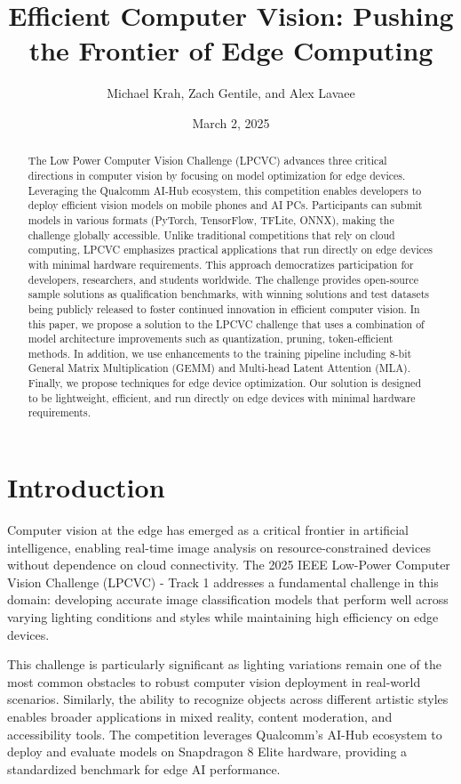 \documentclass[11pt, oneside]{article}   	%
\title{Efficient Computer Vision: Pushing the Frontier of Edge Computing}
\author{Michael Krah, Zach Gentile, and Alex Lavaee}
\date{March 2, 2025}
\begin{document}
\maketitle
\begin{abstract}
	The Low Power Computer Vision Challenge (LPCVC) advances three critical directions in computer vision by focusing on model optimization for edge devices. Leveraging the Qualcomm AI-Hub ecosystem, this competition enables developers to deploy efficient vision models on mobile phones and AI PCs. Participants can submit models in various formats (PyTorch, TensorFlow, TFLite, ONNX), making the challenge globally accessible.
	Unlike traditional competitions that rely on cloud computing, LPCVC emphasizes practical applications that run directly on edge devices with minimal hardware requirements. This approach democratizes participation for developers, researchers, and students worldwide. The challenge provides open-source sample solutions as qualification benchmarks, with winning solutions and test datasets being publicly released to foster continued innovation in efficient computer vision.
	In this paper, we propose a solution to the LPCVC challenge that uses a combination of model architecture improvements such as quantization, pruning, token-efficient methods. In addition, we use enhancements to the training pipeline including 8-bit General Matrix Multiplication (GEMM) and Multi-head Latent Attention (MLA). Finally, we propose techniques for edge device optimization. Our solution is designed to be lightweight, efficient, and run directly on edge devices with minimal hardware requirements.
\end{abstract}

\section*{Introduction}

Computer vision at the edge has emerged as a critical frontier in artificial intelligence, enabling real-time image analysis on resource-constrained devices without dependence on cloud connectivity. The 2025 IEEE Low-Power Computer Vision Challenge (LPCVC) - Track 1 addresses a fundamental challenge in this domain: developing accurate image classification models that perform well across varying lighting conditions and styles while maintaining high efficiency on edge devices.

This challenge is particularly significant as lighting variations remain one of the most common obstacles to robust computer vision deployment in real-world scenarios. Similarly, the ability to recognize objects across different artistic styles enables broader applications in mixed reality, content moderation, and accessibility tools. The competition leverages Qualcomm's AI-Hub ecosystem to deploy and evaluate models on Snapdragon 8 Elite hardware, providing a standardized benchmark for edge AI performance.
\end{document}

